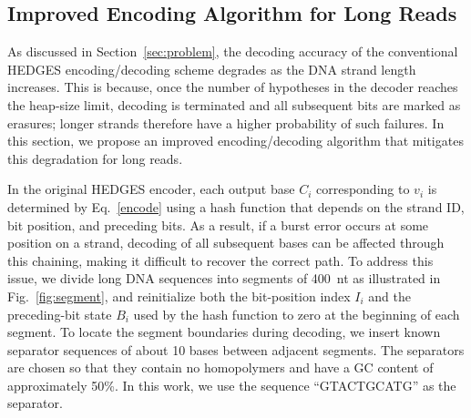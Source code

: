 \documentclass[sotsuron]{kuee}
\begin{document}
\subsection{Improved Encoding Algorithm for Long Reads} \label{long_read_encoding}
As discussed in Section~\ref{sec:problem}, the decoding accuracy of the conventional HEDGES encoding/decoding
scheme degrades as the DNA strand length increases.
This is because, once the number of hypotheses in the decoder reaches the heap-size limit, decoding is terminated
and all subsequent bits are marked as erasures; longer strands therefore have a higher probability of such failures.
In this section, we propose an improved encoding/decoding algorithm that mitigates this degradation for long reads.

In the original HEDGES encoder, each output base $C_i$ corresponding to $v_i$ is determined by Eq.~\eqref{encode}
using a hash function that depends on the strand ID, bit position, and preceding bits.
As a result, if a burst error occurs at some position on a strand, decoding of all subsequent bases can be affected
through this chaining, making it difficult to recover the correct path.
To address this issue, we divide long DNA sequences into segments of 400~nt as illustrated in Fig.~\ref{fig:segment},
and reinitialize both the bit-position index $I_i$ and the preceding-bit state $B_i$ used by the hash function to zero
at the beginning of each segment.
To locate the segment boundaries during decoding, we insert known separator sequences of about 10 bases between
adjacent segments.
The separators are chosen so that they contain no homopolymers and have a GC content of approximately 50\%.
In this work, we use the sequence ``GTACTGCATG'' as the separator.
\end{document}
